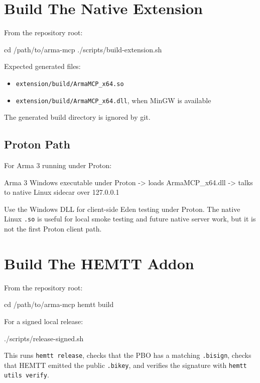\documentclass[11pt]{article}
\newcommand{\code}[1]{\texttt{#1}}
\begin{document}
\section{Build The Native Extension}

From the repository root:

\begin{commandblock}
cd /path/to/arma-mcp
./scripts/build-extension.sh
\end{commandblock}

Expected generated files:

\begin{itemize}
  \item \code{extension/build/ArmaMCP\_x64.so}
  \item \code{extension/build/ArmaMCP\_x64.dll}, when MinGW is available
\end{itemize}

The generated build directory is ignored by git.

\subsection{Proton Path}

For Arma 3 running under Proton:

\begin{commandblock}
Arma 3 Windows executable under Proton
  -> loads ArmaMCP_x64.dll
  -> talks to native Linux sidecar over 127.0.0.1
\end{commandblock}

Use the Windows DLL for client-side Eden testing under Proton. The native Linux
\code{.so} is useful for local smoke testing and future native server work, but it
is not the first Proton client path.

\section{Build The HEMTT Addon}

From the repository root:

\begin{commandblock}
cd /path/to/arma-mcp
hemtt build
\end{commandblock}

For a signed local release:

\begin{commandblock}
./scripts/release-signed.sh
\end{commandblock}

This runs \code{hemtt release}, checks that the PBO has a matching \code{.bisign},
checks that HEMTT emitted the public \code{.bikey}, and verifies the signature
with \code{hemtt utils verify}.
\end{document}
